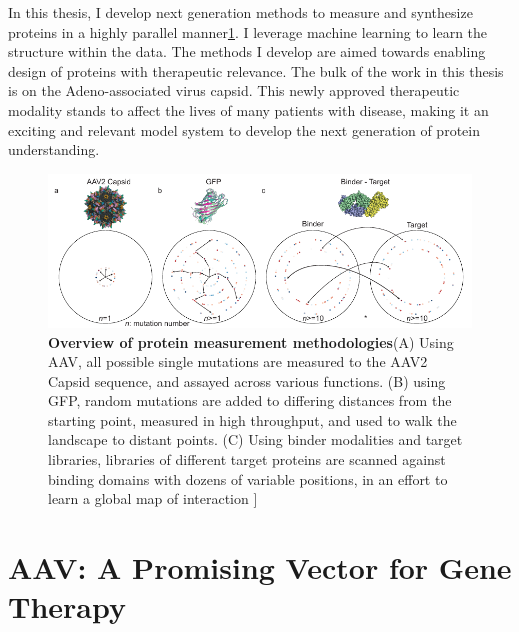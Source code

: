 In this thesis, I develop next generation methods to measure and synthesize proteins in a highly parallel manner\ref{methods-to-measure-proteins}. I leverage machine learning to learn the structure within the data.  The methods I develop are aimed towards enabling design of proteins with therapeutic relevance. The bulk of the work in this thesis is on the Adeno-associated virus capsid. This newly approved therapeutic modality stands to affect the lives of many patients with disease, making it an exciting and relevant model system to develop the next generation of protein understanding. 

\begin{figure}[t!]
\includegraphics[width=\textwidth]{figures/20190612_x03_landscape_walks.pdf}
\caption[Overview of protein measurement methodologies]{\textbf{Overview of protein measurement methodologies}(A) Using AAV, all possible single mutations are measured to the AAV2 Capsid sequence, and assayed across various functions. (B) using GFP, random mutations are added to differing distances from the starting point, measured in high throughput, and used to walk the landscape to distant points. (C) Using binder modalities and target libraries, libraries of different target proteins are scanned against binding domains with dozens of variable positions, in an effort to learn a global map of interaction ]
\label{methods-to-measure-proteins}}
\end{figure}


\section{AAV: A Promising Vector for Gene Therapy}

